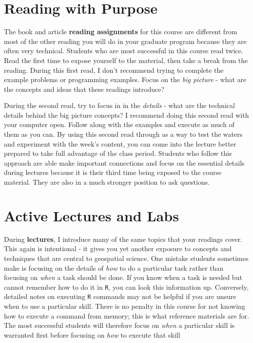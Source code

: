 \documentclass[]{book}
\theoremstyle{definition}
\theoremstyle{definition}
\theoremstyle{definition}
\theoremstyle{remark}
\begin{document}
\section{Reading with Purpose}\label{reading-with-purpose}

The book and article \textbf{reading assignments} for this course are
different from most of the other reading you will do in your graduate
program because they are often very technical. Students who are most
successful in this course read twice. Read the first time to expose
yourself to the material, then take a break from the reading. During
this first read, I don't recommend trying to complete the example
problems or programming examples. Focus on the \emph{big picture} - what
are the concepts and ideas that these readings introduce?

During the second read, try to focus in in the \emph{details} - what are
the technical details behind the big picture concepts? I recommend doing
this second read with your computer open. Follow along with the examples
and execute as much of them as you can. By using this second read
through as a way to test the waters and experiment with the week's
content, you can come into the lecture better prepared to take full
advantage of the class period. Students who follow this approach are
able make important connections and focus on the essential details
during lectures because it is their third time being exposed to the
course material. They are also in a much stronger position to ask
questions.

\section{Active Lectures and Labs}\label{active-lectures-and-labs}

During \textbf{lectures}, I introduce many of the same topics that your
readings cover. This again is intentional - it gives you yet another
exposure to concepts and techniques that are central to geospatial
science. One mistake students sometimes make is focusing on the details
of \emph{how} to do a particular task rather than focusing on
\emph{when} a task should be done. If you know when a task is needed but
cannot remember how to do it in \texttt{R}, you can look this
information up. Conversely, detailed notes on executing \texttt{R}
commands may not be helpful if you are unsure when to use a particular
skill. There is no penalty in this course for not knowing how to execute
a command from memory; this is what reference materials are for. The
most successful students will therefore focus on \emph{when} a
particular skill is warranted first before focusing on \emph{how} to
execute that skill
\end{document}
